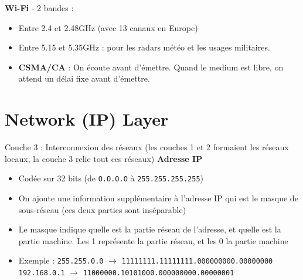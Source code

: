 \documentclass[a4paper,9pt, twocolumn]{article}
\begin{document}
\textbf{Wi-Fi} - 2 bandes : 
\begin{itemize}
\item Entre 2.4 et 2.48GHz (avec 13 canaux en Europe)
\item Entre 5.15 et 5.35GHz : pour les radars météo et les usages militaires.
\item \textbf{CSMA/CA} : On écoute avant d'émettre. Quand le medium est libre, on attend un délai fixe avant d'émettre.
\end{itemize}
\section*{Network (IP) Layer}
Couche 3 : Interconnexion des réseaux (les couches 1 et 2 formaient les réseaux locaux, la couche 3 relie tout ces réseaux) 
\textbf{Adresse IP}
\begin{itemize}
\item Codée sur 32 bits (de \texttt{O.O.O.O} à \texttt{255.255.255.255})
\item On ajoute une information supplémentaire à l'adresse IP qui est le masque de sous-réseau (ces deux parties sont inséparable)
\item Le masque indique quelle est la partie réseau de l'adresse, et quelle est la partie machine. Les 1 représente la partie réseau, et les 0 la partie machine
\item Exemple : 
\texttt{255.255.0.0} $\longrightarrow$ \texttt{11111111.11111111.000000000.00000000}
\texttt{192.168.0.1} $\longrightarrow$ \texttt{11000000.10101000.000000000.00000001}
\end{itemize}
\end{document}
